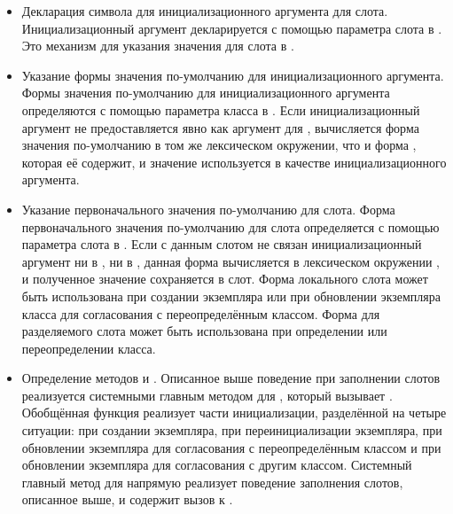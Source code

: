 \begin{itemize}

\item Декларация символа для инициализационного аргумента для
  слота. Инициализационный аргумент декларируется с помощью параметра слота
   в . Это механизм для указания значения для слота в
  .

\item Указание формы значения по-умолчанию для инициализационного
  аргумента. Формы значения по-умолчанию для инициализационного аргумента
  определяются с помощью параметра класса  в
  . Если инициализационный аргумент не предоставляется явно как
  аргумент для , вычисляется форма значения по-умолчанию в
  том же лексическом окружении, что и форма , которая её содержит,
  и значение используется в качестве инициализационного аргумента.

\item Указание первоначального значения по-умолчанию для слота. Форма первоначального
  значения по-умолчанию для слота определяется с помощью параметра слота
   в . Если с данным слотом не связан
  инициализационный аргумент ни в , ни в
  , данная форма вычисляется в лексическом окружении
  , и полученное значение сохраняется в слот. Форма 
  локального слота может быть использована при создании экземпляра или при
  обновлении экземпляра класса для согласования с переопределённым
  классом. Форма  для разделяемого слота может быть использована
  при определении или переопределении класса.

\item Определение методов  и
  . Описанное выше поведение при заполнении слотов
  реализуется системными главным методом для ,
  который вызывает . Обобщённая функция
   реализует части инициализации, разделённой на четыре
  ситуации: при создании экземпляра, при переинициализации экземпляра, при
  обновлении экземпляра для согласования с переопределённым классом и при
  обновлении экземпляра для согласования с другим классом. Системный главный
  метод для  напрямую реализует поведение заполнения
  слотов, описанное выше, и  содержит вызов к
  .

\end{itemize}

